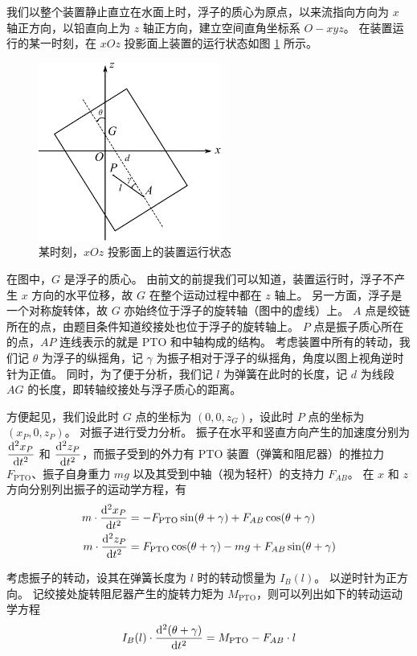 我们以整个装置静止直立在水面上时，浮子的质心为原点，以来流指向方向为 $x$ 轴正方向，以铅直向上为 $z$ 轴正方向，建立空间直角坐标系 $O-xyz$。
在装置运行的某一时刻，在 $xOz$ 投影面上装置的运行状态如图 \ref{status} 所示。
\begin{figure}[htbp]
    \centering
    \includegraphics[width=6cm]{fig/problem-3-1.pdf}
    \caption{某时刻，$xOz$ 投影面上的装置运行状态}
    \label{status}
\end{figure}

在图中，$G$ 是浮子的质心。
由前文的前提我们可以知道，装置运行时，浮子不产生 $x$ 方向的水平位移，故 $G$ 在整个运动过程中都在 $z$ 轴上。
另一方面，浮子是一个对称旋转体，故 $G$ 亦始终位于浮子的旋转轴（图中的虚线）上。
$A$ 点是绞链所在的点，由题目条件知道绞接处也位于浮子的旋转轴上。
$P$ 点是振子质心所在的点，$AP$ 连线表示的就是 PTO 和中轴构成的结构。
考虑装置中所有的转动，我们记 $\theta$ 为浮子的纵摇角，记 $\gamma$ 为振子相对于浮子的纵摇角，角度以图上视角逆时针为正值。
同时，为了便于分析，我们记 $l$ 为弹簧在此时的长度，记 $d$ 为线段 $AG$ 的长度，即转轴绞接处与浮子质心的距离。

方便起见，我们设此时 $G$ 点的坐标为 $(0, 0, z_G)$，设此时 $P$ 点的坐标为 $(x_P, 0, z_P)$。
对振子进行受力分析。
振子在水平和竖直方向产生的加速度分别为 $\dfrac{\mathop{}\!\mathrm{d}^2 x_P}{\mathop{}\!\mathrm{d} t^2}$ 和 $\dfrac{\mathop{}\!\mathrm{d}^2 z_P}{\mathop{}\!\mathrm{d} t^2}$，而振子受到的外力有 PTO 装置（弹簧和阻尼器）的推拉力 $F_\text{PTO}$、振子自身重力 $mg$ 以及其受到中轴（视为轻杆）的支持力 $F_{AB}$。
在 $x$ 和 $z$ 方向分别列出振子的运动学方程，有
\begin{align}
    m\cdot\dfrac{\mathop{}\!\mathrm{d}^2 x_P}{\mathop{}\!\mathrm{d} t^2} &= -F_\text{PTO}\sin(\theta+\gamma)+F_{AB}\cos(\theta+\gamma) \label{problem-3-eq1}\\
    m\cdot\dfrac{\mathop{}\!\mathrm{d}^2 z_P}{\mathop{}\!\mathrm{d} t^2} &= F_\text{PTO}\cos(\theta+\gamma)-mg+F_{AB}\sin(\theta+\gamma)
\end{align}

考虑振子的转动，设其在弹簧长度为 $l$ 时的转动惯量为 $I_B(l)$。
以逆时针为正方向。
记绞接处旋转阻尼器产生的旋转力矩为 $M_\text{PTO}$，则可以列出如下的转动运动学方程
\begin{equation}
    I_B(l)\cdot\dfrac{\mathop{}\!\mathrm{d}^2(\theta+\gamma)}{\mathop{}\!\mathrm{d} t^2}=M_\text{PTO}-F_{AB}\cdot l
\end{equation}

